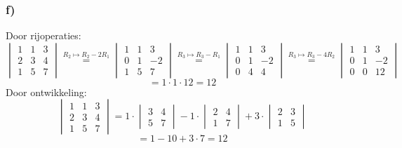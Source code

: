\documentclass[lineaire_algebra_oplossingen.tex]{subfiles}
\begin{document}
\subsubsection*{f)}
Door rijoperaties:
$$
\begin{vmatrix}
1 & 1 & 3\\
2 & 3 & 4\\
1 & 5 & 7
\end{vmatrix}
\overset{R_2 \longmapsto R_2-2R_1}{=}
\begin{vmatrix}
1 & 1 & 3\\
0 & 1 & -2\\
1 & 5 & 7
\end{vmatrix}
\overset{R_3 \longmapsto R_3-R_1}{=}
\begin{vmatrix}
1 & 1 & 3\\
0 & 1 & -2\\
0 & 4 & 4
\end{vmatrix}
\overset{R_3 \longmapsto R_3-4R_2}{=}
\begin{vmatrix}
1 & 1 & 3\\
0 & 1 & -2\\
0 & 0 & 12
\end{vmatrix}
$$
$$ = 1\cdot 1 \cdot 12 = 12$$
Door ontwikkeling:
$$
\begin{vmatrix}
1 & 1 & 3\\
2 & 3 & 4\\
1 & 5 & 7
\end{vmatrix}
= 1 \cdot
\begin{vmatrix}
3 & 4\\
5 & 7
\end{vmatrix}
- 1 \cdot 
\begin{vmatrix}
2 & 4\\
1 & 7
\end{vmatrix}
+3\cdot
\begin{vmatrix}
2 & 3\\
1 & 5
\end{vmatrix}
$$
$$
= 1 - 10 + 3\cdot 7 = 12
$$
\end{document}

